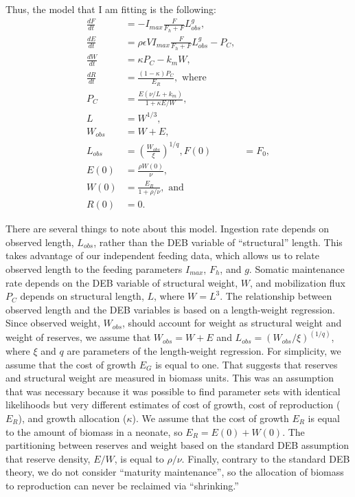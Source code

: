 \documentclass[12pt,reqno,final,pdftex]{amsart}\usepackage[]{graphicx}\usepackage[]{color}
\theoremstyle{plain}
\numberwithin{equation}{part}
\begin{document}
Thus, the model that I am fitting is the following:
\begin{align}
\frac{dF}{dt} &= -I_{max} \frac{F}{F_h+F} L_{obs}^g, \\
\frac{dE}{dt} &= \rho \epsilon V I_{max} \frac{F}{F_h+F} L_{obs}^g - P_C, \\
\frac{dW}{dt} &= \kappa P_C - k_m W, \\
\frac{dR}{dt} &= \frac{(1-\kappa) P_C}{E_R}, \text{ where} \\
P_C &= \frac{E (\nu/L + k_m)}{1 + \kappa E/W}, \\
L &= W^{1/3}, \\
W_{obs} &= W + E, \\
L_{obs} &= (\frac{W_{obs}}{\xi})^{1/q},
F(0) &= F_0, \\
E(0) &= \frac{\rho W(0)}{\nu}, \\
W(0) &= \frac{E_R}{1+\rho/\nu}, \text{ and}\\
R(0) &= 0.
\end{align}

There are several things to note about this model.
Ingestion rate depends on observed length, $L_{obs}$, rather than the DEB variable of ``structural'' length.
This takes advantage of our independent feeding data, which allows us to relate observed length to the feeding parameters $I_{max}$, $F_h$, and $g$.
Somatic maintenance rate depends on the DEB variable of structural weight, $W$, and mobilization flux $P_C$ depends on structural length, $L$, where $W = L^3$.
The relationship between observed length and the DEB variables is based on a length-weight regression.
Since observed weight, $W_{obs}$, should account for weight as structural weight and weight of reserves, we assume that $W_{obs} = W + E$ and $L_{obs} = (W_{obs}/\xi)^{(1/q)}$, where $\xi$ and $q$ are parameters of the length-weight regression.
For simplicity, we assume that the cost of growth $E_G$ is equal to one.
That suggests that reserves and structural weight are measured in biomass units.
This was an assumption that was necessary because it was possible to find parameter sets with identical likelihoods but very different estimates of cost of growth, cost of reproduction ($E_R$), and growth allocation ($\kappa$).
We assume that the cost of growth $E_R$ is equal to the amount of biomass in a neonate, so $E_R = E(0) + W(0)$.
The partitioning between reserves and weight based on the standard DEB assumption that reserve density, $E/W$, is equal to $\rho/\nu$.
Finally, contrary to the standard DEB theory, we do not consider ``maturity maintenance'', so the allocation of biomass to reproduction can never be reclaimed via ``shrinking.''
\end{document}
